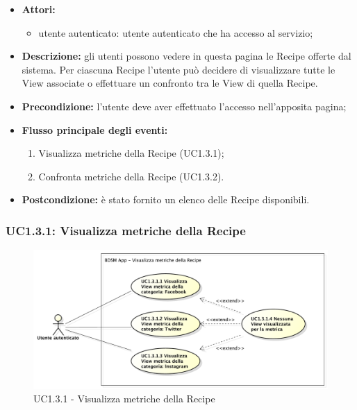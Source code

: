 \begin{itemize}
	\item \textbf{Attori:}
	\begin{itemize}
		\item utente autenticato: utente autenticato che ha accesso al servizio;
	\end{itemize}
	\item \textbf{Descrizione:} gli utenti possono vedere in questa pagina le Recipe offerte dal sistema. Per ciascuna Recipe l'utente può decidere di visualizzare tutte le View associate o effettuare un confronto tra le View di quella Recipe.
	\item \textbf{Precondizione:} l'utente deve aver effettuato l'accesso nell'apposita pagina;
	\item \textbf{Flusso principale degli eventi:}
	\begin{enumerate}
		\item Visualizza metriche della Recipe (UC1.3.1);
		\item Confronta metriche della Recipe (UC1.3.2).
	\end{enumerate}
	\item \textbf{Postcondizione:} è stato fornito un elenco delle Recipe disponibili.
\end{itemize}

\subsubsection{UC1.3.1: Visualizza metriche della Recipe}
\begin{figure}[!htbp]
	\centering
	\centerline{\includegraphics[scale=0.45]{./images/UC1_3_1.pdf}}
	\caption{UC1.3.1 - Visualizza metriche della Recipe}
\end{figure}


